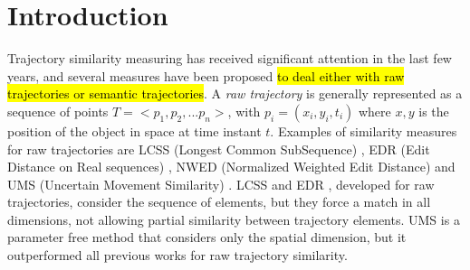 \documentclass[12pt]{article}
\providecommand{\keywords}[1]
{
  \small    
  \textbf{\textit{Keywords---}} #1
}
\begin{document}
 




\section{Introduction}
Trajectory similarity measuring has received significant attention in the last few years, and several measures have been proposed \hl{to deal either with raw trajectories or semantic trajectories}. A \emph{raw trajectory} is generally represented as a sequence of points $T=<p_1, p_2, ...p_n>$, with $p_i=(x_i,y_i,t_i)$ where $x,y$ is the position of the object in space at time instant $t$.  Examples of similarity measures for raw trajectories are LCSS (Longest Common SubSequence) \citep{vlachos2002discovering}, EDR (Edit Distance on Real sequences) \citep{Chen:2005:RFS:1066157.1066213}, NWED (Normalized Weighted Edit Distance) \citep{dodge2012} and UMS (Uncertain Movement Similarity) \citep{Furtado-UMS-2018}. LCSS \citep{vlachos2002discovering} and EDR \citep{Chen:2005:RFS:1066157.1066213}, developed for raw trajectories, consider the sequence of elements, but they force a match in all dimensions, not allowing partial similarity between trajectory elements.  %
UMS \cite{Furtado-UMS-2018} is a parameter free method that considers only the spatial dimension, but it outperformed all previous works for raw trajectory similarity. 
\end{document}
